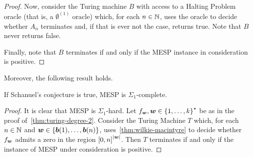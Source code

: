 \begin{proof}
Now, consider the Turing machine $B$ with access to a Halting Problem oracle (that is, a $\emptyset^{(1)}$ oracle) which, for each $n \in \mathbb{N}$, uses the oracle to decide whether $A_{n}$ terminates and, if that is ever not the case, returns true. Note that $B$ never returns false.

Finally, note that $B$ terminates if and only if the MESP instance in consideration is positive.
\end{proof}

Moreover, the following result holds.

\begin{theorem}
  If Schanuel's conjecture is true, MESP is $\Sigma_{1}$-complete.
\end{theorem}

\begin{proof}
  It is clear that MESP is $\Sigma_{1}$-hard.
  Let $f_{\boldsymbol{w}}, \boldsymbol{w} \in {\lbrace 1, \ldots, k \rbrace}^{\star}$ be as in the proof of~\cref{thm:turing-degree-2}.
  Consider the Turing Machine $T$ which, for each $n \in \mathbb{N}$ and $\boldsymbol{w} \in \lbrace \boldsymbol{b}(1), \ldots, \boldsymbol{b}(n) \rbrace$, uses~\cref{thm:wilkie-macintyre} to decide whether $f_{\boldsymbol{w}}$ admits a zero in the region ${[0,n]}^{\lvert \boldsymbol{w} \rvert}$.
  Then $T$ terminates if and only if the instance of MESP under consideration is positive.
\end{proof}
